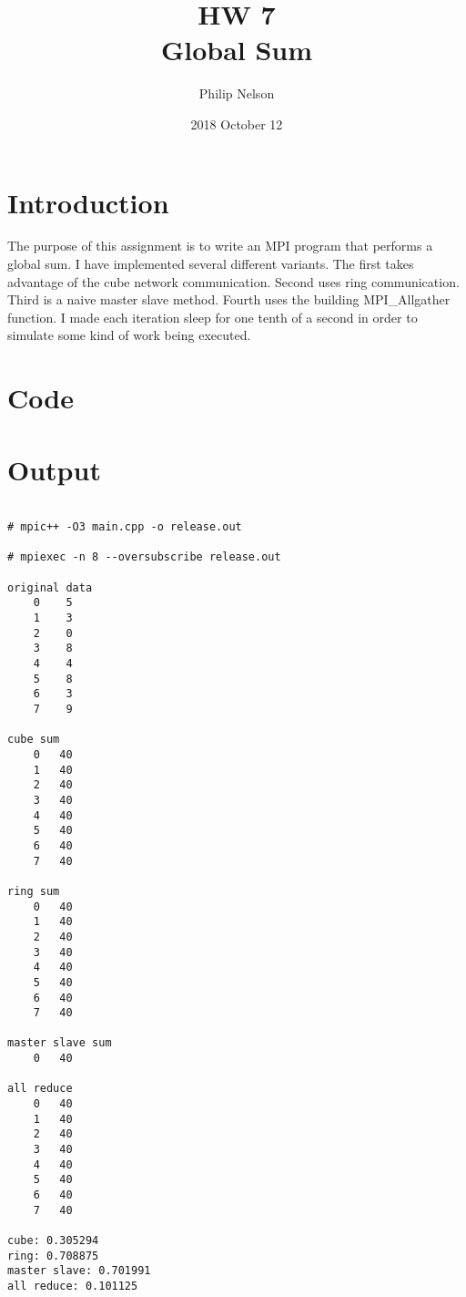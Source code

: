 \documentclass{article}
\title{HW 7 \\ Global Sum}
\author{Philip Nelson}
\date{2018 October 12}
\begin{document}
\maketitle

\section*{Introduction}

The purpose of this assignment is to write an MPI program that performs a global sum. I have implemented several different variants. The first takes advantage of the cube network communication. Second uses ring communication. Third is a naive master slave method. Fourth uses the building MPI\_Allgather function. I made each iteration sleep for one tenth of a second in order to simulate some kind of work being executed.

\section*{Code}


\newpage

\section*{Output}

\begin{lstlisting}[showstringspaces=false]

# mpic++ -O3 main.cpp -o release.out

# mpiexec -n 8 --oversubscribe release.out

original data                                               
    0    5
    1    3
    2    0
    3    8
    4    4
    5    8
    6    3
    7    9

cube sum
    0   40
    1   40
    2   40
    3   40
    4   40
    5   40
    6   40
    7   40

ring sum
    0   40
    1   40
    2   40
    3   40
    4   40
    5   40
    6   40
    7   40

master slave sum
    0   40

all reduce
    0   40
    1   40
    2   40
    3   40
    4   40
    5   40
    6   40
    7   40

cube: 0.305294
ring: 0.708875
master slave: 0.701991
all reduce: 0.101125

\end{lstlisting}
\end{document}
